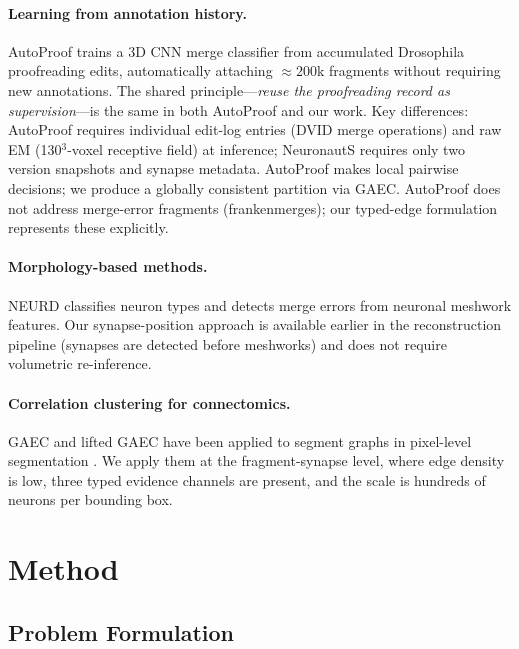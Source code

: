 \documentclass[10pt,letterpaper]{article}
\newcommand{\neuronauts}{NeuronautS\xspace}
\begin{document}
\paragraph{Learning from annotation history.} AutoProof \cite{huang2025autoproof} trains
a 3D CNN merge classifier from accumulated Drosophila proofreading edits, automatically
attaching ${\approx}200$k fragments without requiring new annotations. The shared
principle---\emph{reuse the proofreading record as supervision}---is the same in both
AutoProof and our work. Key differences: AutoProof requires individual edit-log entries
(DVID merge operations) and raw EM (130$^3$-voxel receptive field) at inference;
\neuronauts requires only two version snapshots and synapse metadata. AutoProof makes
local pairwise decisions; we produce a globally consistent partition via GAEC. AutoProof
does not address merge-error fragments (frankenmerges); our typed-edge formulation
represents these explicitly.

\paragraph{Morphology-based methods.} NEURD \cite{bae2023neurd} classifies neuron types
and detects merge errors from neuronal meshwork features. Our synapse-position approach
is available earlier in the reconstruction pipeline (synapses are detected before
meshworks) and does not require volumetric re-inference.

\paragraph{Correlation clustering for connectomics.} GAEC and lifted GAEC have been
applied to segment graphs in pixel-level segmentation \cite{keuper2015multicuts}. We
apply them at the fragment-synapse level, where edge density is low, three typed evidence
channels are present, and the scale is hundreds of neurons per bounding box.

\section{Method}

\subsection{Problem Formulation}
\end{document}
